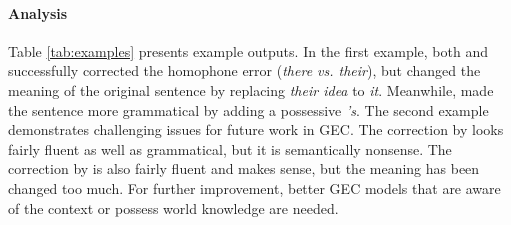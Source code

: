 \vspace{-1mm}
\paragraph{Analysis}
Table \ref{tab:examples} presents example outputs. 
In the first example, both \mle and \proposed successfully corrected the homophone error ({\em there vs. their}), but \mle changed the meaning of the original sentence by replacing {\em their idea} to {\em it}. 
Meanwhile, \proposed made the sentence more grammatical by adding a possessive {\em 's}.
The second example demonstrates challenging issues for future work in GEC. 
The correction by \mle looks fairly fluent as well as grammatical, but it is semantically nonsense. 
The correction by \proposed is also fairly fluent and makes sense, but the meaning has been changed too much.
For further improvement, better GEC models that are aware of the context or possess world knowledge are needed.
